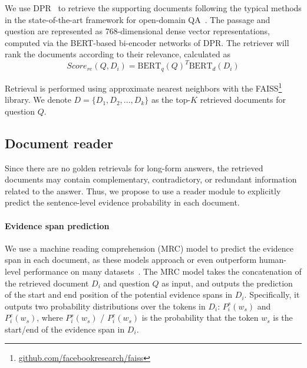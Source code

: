 \documentclass[11pt]{article}
\begin{document}
We use DPR~\cite{karpukhin2020dense} to retrieve the supporting documents following the typical methods in the state-of-the-art framework for open-domain QA~\cite{izacard2021leveraging,NEURIPS2020_6b493230}. The passage and question are represented as 768-dimensional dense vector representations, computed via the BERT-based bi-encoder networks of DPR. The retriever will rank the documents according to their relevance, calculated as
\setlength{\abovedisplayskip}{3pt}
\setlength{\belowdisplayskip}{3pt}
\begin{equation}
Score_{re}(Q, D_i) = \text{BERT}_q(Q)^T \text{BERT}_d(D_i)
\label{eqa:retriever_score}
\end{equation}

Retrieval is performed using approximate nearest neighbors with the FAISS\footnote{\url{github.com/facebookresearch/faiss}} library. We denote $D=\{D_1, D_2,..., D_k\}$ as the top-$K$ retrieved documents for question $Q$. 



\subsection{Document reader}
Since there are no golden retrievals for long-form answers, the retrieved documents may contain complementary, contradictory, or redundant information related to the answer. Thus, we propose to use a reader module to explicitly predict the sentence-level evidence probability in each document.  


\paragraph{Evidence span prediction}
We use a machine reading comprehension (MRC) model to predict the evidence span in each document, as these models approach or even outperform human-level performance on many datasets~\cite{joshi2020spanbert}. The MRC model takes the concatenation of the retrieved document $D_i$ and question $Q$ as input, and outputs the prediction of the start and end position of the potential evidence spans in $D_i$. Specifically, it outputs two probability distributions over the tokens in $D_i$: $P^s_i(w_s)$ and $P^e_i(w_s)$, where $P^s_i(w_s)$ / $P^e_i(w_s)$ is the probability that the token $w_s$ is the start/end of the evidence span in $D_i$. 



\vspace{3pt}
\end{document}
